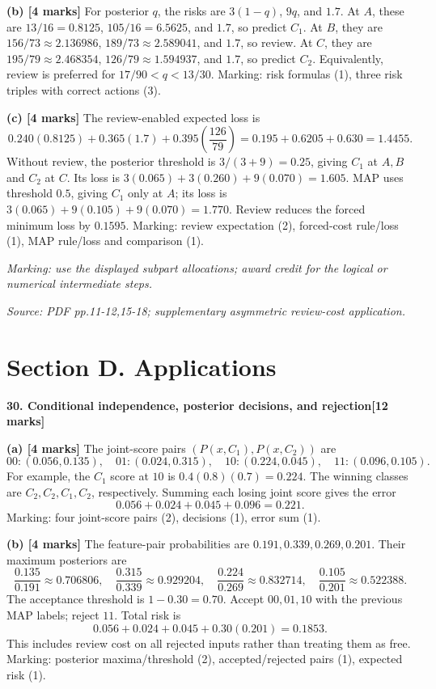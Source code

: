 \documentclass[11pt,a4paper]{article}
\begin{document}
\textbf{(b) [4 marks]} For posterior \(q\), the risks are \(3(1-q)\), \(9q\), and \(1.7\). At \(A\), these are \(13/16=0.8125\), \(105/16=6.5625\), and \(1.7\), so predict \(C_1\). At \(B\), they are \(156/73\approx2.136986\), \(189/73\approx2.589041\), and \(1.7\), so review. At \(C\), they are \(195/79\approx2.468354\), \(126/79\approx1.594937\), and \(1.7\), so predict \(C_2\). Equivalently, review is preferred for \(17/90<q<13/30\). Marking: risk formulas (1), three risk triples with correct actions (3).

\textbf{(c) [4 marks]} The review-enabled expected loss is
\[
0.240(0.8125)+0.365(1.7)+0.395\left(\frac{126}{79}\right)
=0.195+0.6205+0.630=1.4455.
\]
Without review, the posterior threshold is \(3/(3+9)=0.25\), giving \(C_1\) at \(A,B\) and \(C_2\) at \(C\). Its loss is \(3(0.065)+3(0.260)+9(0.070)=1.605\). MAP uses threshold \(0.5\), giving \(C_1\) only at \(A\); its loss is \(3(0.065)+9(0.105)+9(0.070)=1.770\). Review reduces the forced minimum loss by \(0.1595\). Marking: review expectation (2), forced-cost rule/loss (1), MAP rule/loss and comparison (1).

\textit{Marking: use the displayed subpart allocations; award credit for the logical or numerical intermediate steps.}\par
{\footnotesize\textit{Source: PDF pp.11-12,15-18; supplementary asymmetric review-cost application.}}
\newpage\section*{Section D. Applications}
\textbf{30. Conditional independence, posterior decisions, and rejection}\hfill\textbf{[12 marks]}\par\medskip
\textbf{(a) [4 marks]} The joint-score pairs \((P(x,C_1),P(x,C_2))\) are
\[
00:(0.056,0.135),\quad01:(0.024,0.315),\quad
10:(0.224,0.045),\quad11:(0.096,0.105).
\]
For example, the \(C_1\) score at \(10\) is \(0.4(0.8)(0.7)=0.224\). The winning classes are \(C_2,C_2,C_1,C_2\), respectively. Summing each losing joint score gives the error
\[
0.056+0.024+0.045+0.096=0.221.
\]
Marking: four joint-score pairs (2), decisions (1), error sum (1).

\textbf{(b) [4 marks]} The feature-pair probabilities are \(0.191,0.339,0.269,0.201\). Their maximum posteriors are
\[
\frac{0.135}{0.191}\approx0.706806,\quad
\frac{0.315}{0.339}\approx0.929204,\quad
\frac{0.224}{0.269}\approx0.832714,\quad
\frac{0.105}{0.201}\approx0.522388.
\]
The acceptance threshold is \(1-0.30=0.70\). Accept \(00,01,10\) with the previous MAP labels; reject \(11\). Total risk is
\[
0.056+0.024+0.045+0.30(0.201)=0.1853.
\]
This includes review cost on all rejected inputs rather than treating them as free. Marking: posterior maxima/threshold (2), accepted/rejected pairs (1), expected risk (1).
\end{document}
